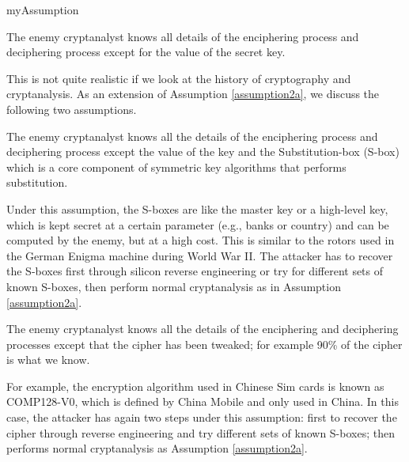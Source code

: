 \begin{subtheorem}{myAssumption} 
	\begin{myAssumption} \label{assumption2a}
		The enemy cryptanalyst knows all details of the enciphering process and deciphering process except for the value of the secret key.
	\end{myAssumption}
	
	This is not quite realistic if we look at the history of cryptography and cryptanalysis. As an extension of  Assumption \ref{assumption2a}, we discuss the following two assumptions. 
	
	\begin{myAssumption} \label{assumption2b}
		The enemy cryptanalyst knows all the details of the enciphering process and deciphering process except the value of the key and the Substitution-box (S-box) which is a core component of symmetric key algorithms that performs substitution.
	\end{myAssumption}
	
	Under this assumption, the S-boxes are like the master key or a high-level key, which is kept secret at a certain parameter (e.g., banks or country) and can be computed by the enemy, but at a high cost. This is similar to the rotors used in the German Enigma machine during World War II. The attacker has to recover the S-boxes first through silicon reverse engineering or try for different sets of known S-boxes, then perform normal cryptanalysis as in Assumption \ref{assumption2a}.
	
	\begin{myAssumption}\label{assumption2c}
			The enemy cryptanalyst knows all the details of the enciphering and deciphering processes except that the cipher has been tweaked; for example 90\% of the cipher is what we know.
	\end{myAssumption}
\end{subtheorem}

For example, the encryption algorithm used in Chinese Sim cards is known as COMP128-V0, which is defined by China Mobile and only used in China. In this case, the attacker has again two steps under this assumption: first to recover the cipher through reverse engineering and try different sets of known S-boxes; then performs normal cryptanalysis as Assumption \ref{assumption2a}.

